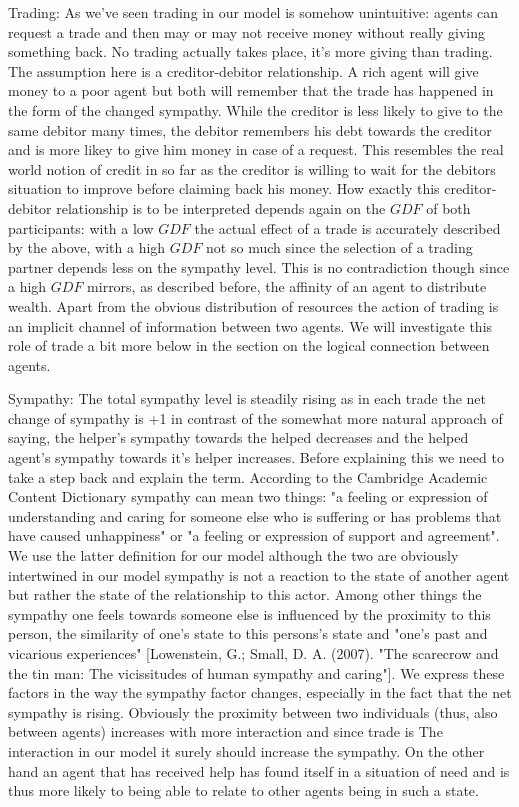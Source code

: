 \documentclass{JASSS}
\newcommand{\gdf}{\mathit{GDF}}
\begin{document}
\begin{description*}
		\item[Trading:]
			As we've seen trading in our model is somehow unintuitive: agents can request a trade and then may or may not receive money without really giving something back. No trading actually takes place, it's more giving than trading. The assumption here is a creditor-debitor relationship. A rich agent will give money to a poor agent but both will remember that the trade has happened in the form of the changed sympathy. While the creditor is less likely to give to the same debitor many times, the debitor remembers his debt towards the creditor and is more likey to give him money in case of a request. This resembles the real world notion of credit in so far as the creditor is willing to wait for the debitors situation to improve before claiming back his money. How exactly this creditor-debitor relationship is to be interpreted depends again on the $\gdf$ of both participants: with a low $\gdf$ the actual effect of a trade is accurately described by the above, with a high $\gdf$ not so much since the selection of a trading partner depends less on the sympathy level. This is no contradiction though since a high $\gdf$ mirrors, as described before, the affinity of an agent to distribute wealth. Apart from the obvious distribution of resources the action of trading is an implicit channel of information between two agents. We will investigate this role of trade a bit more below in the section on the logical connection between agents.
			
		\item[Sympathy:]
			The total sympathy level is steadily rising as in each trade the net change of sympathy is +1 in contrast of the somewhat more natural approach of saying, the helper's sympathy towards the helped decreases and the helped agent's sympathy towards it's helper increases. Before explaining this we need to take a step back and explain the term. According to the Cambridge Academic Content Dictionary sympathy can mean two things: "a feeling or expression of understanding and caring for someone else who is suffering or has problems that have caused unhappiness" or "a feeling or expression of support and agreement". We use the latter definition for our model although the two are obviously intertwined in our model sympathy is not a reaction to the state of another agent but rather the state of the relationship to this actor. Among other things the sympathy one feels towards someone else is influenced by the proximity to this person, the similarity of one's state to this persons's state and "one's past and vicarious experiences" [Lowenstein, G.; Small, D. A. (2007). "The scarecrow and the tin man: The vicissitudes of human sympathy and caring"]. We express these factors in the way the sympathy factor changes, especially in the fact that the net sympathy is rising. Obviously the proximity between two individuals (thus, also between agents) increases with more interaction and since trade is The interaction in our model it surely should increase the sympathy. On the other hand an agent that has received help has found itself in a situation of need and is thus more likely to being able to relate to other agents being in such a state. 
	\end{description*}
	
\end{document}
